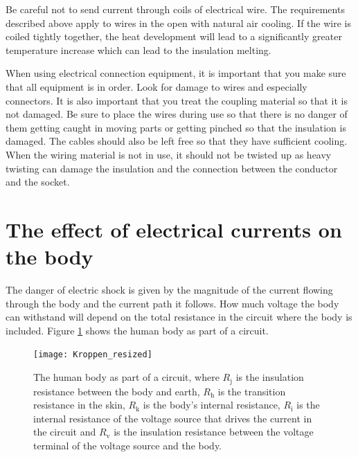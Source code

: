 \documentclass[../Elmag-labhefte-2020.tex]{subfiles}
\begin{document}
Be careful not to send current through coils of electrical wire. The requirements described above apply to wires in the open with natural air cooling. If the wire is coiled tightly together, the heat development will lead to a significantly greater temperature increase which can lead to the insulation melting.

When using electrical connection equipment, it is important that you make sure that all equipment is in order. Look for damage to wires and especially connectors. It is also important that you treat the coupling material so that it is not damaged. Be sure to place the wires during use so that there is no danger of them getting caught in moving parts or getting pinched so that the insulation is damaged. The cables should also be left free so that they have sufficient cooling. When the wiring material is not in use, it should not be twisted up as heavy twisting can damage the insulation and the connection between the conductor and the socket.


\section{The effect of electrical currents on the body}

The danger of electric shock is given by the magnitude of the current flowing through the body and the current path it follows. How much voltage the body can withstand will depend on the total resistance in the circuit where the body is included. Figure \ref{fig:Kroppen} shows the human body as part of a circuit.


\begin{figure}[htbp] 
    \centering
    \texttt{[image: Kroppen\_resized]}
    \caption{
The human body as part of a circuit, where $R_\text{j} $ is the insulation resistance between the body and earth, $R_\text {h} $ is the transition resistance in the skin, $ R_\text {k} $ is the body's internal resistance, $ R_\text {i} $ is the internal resistance of the voltage source that drives the current in the circuit and $ R_\text {v} $ is the insulation resistance between the voltage terminal of the voltage source and the body. 
    }
    \label{fig:Kroppen}
\end{figure}
\end{document}

